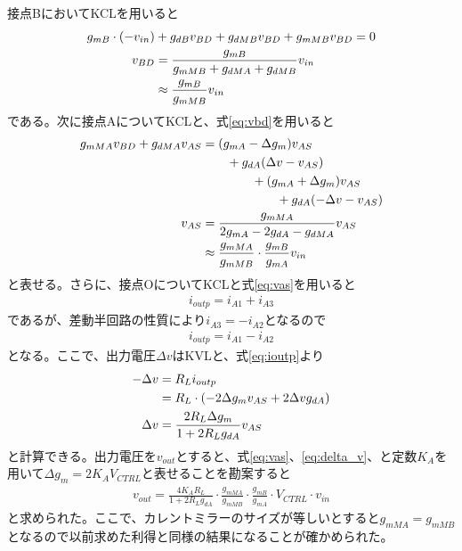 \documentclass[twocolumn]{jsarticle}
\begin{document}
    接点BにおいてKCLを用いると
    \begin{align}
        g_{mB}\cdot(-v_{in})&+g_{dB}v_{BD} +g_{dMB}v_{BD}+g_{mMB}v_{BD}=0       \notag\\
        v_{BD}&=\frac{g_{mB}}{g_{mMB}+g_{dMA}+g_{dMB}}v_{in}          \notag\\
        &\approx \frac{g_{mB}}{g_{mMB}}v_{in}    \label{eq:vbd}
    \end{align}
    である。次に接点AについてKCLと、式\eqref{eq:vbd}を用いると
    \begin{align}
        g_{mMA}v_{BD}+g_{dMA}v_{AS}&=(g_{mA}-\Delta g_{m})v_{AS} \notag\\ &\quad\quad +g_{dA}(\Delta v -v_{AS})       \notag\\
        & \quad\quad\quad\quad +(g_{mA}+\Delta g_{m})v_{AS} \notag\\& \quad\quad\quad\quad\quad\quad +g_{dA}(-\Delta v -v_{AS})       \notag\\
        v_{AS}&=\frac{g_{mMA}}{2g_{mA}-2g_{dA}-g_{dMA}}v_{AS}   \notag\\
        &\approx \frac{g_{mMA}}{g_{mMB}}\cdot\frac{g_{mB}}{g_{mA}}v_{in}    \label{eq:vas}
    \end{align}
    と表せる。さらに、接点OについてKCLと式\eqref{eq:vas}を用いると
    \begin{align}
        i_{outp} = i_{A1}+i_{A3}
    \end{align}
    であるが、差動半回路の性質により$i_{A3}=-i_{A2}$となるので
    \begin{align}
        i_{outp} = i_{A1}-i_{A2}    \label{eq:ioutp}
    \end{align}
    となる。ここで、出力電圧$\Delta v$はKVLと、式\eqref{eq:ioutp}より
    \begin{align}
        -\Delta v&=R_{L}i_{outp}    \notag\\
        &=R_{L}\cdot(-2\Delta g_{m}v_{AS}+2\Delta vg_{dA})      \notag\\
        \Delta v&=\frac{2R_{L}\Delta g_{m}}{1+2R_{L}g_{dA}}v_{AS}   \label{eq:delta_v}
    \end{align}
    と計算できる。出力電圧を$v_{out}$とすると、式\eqref{eq:vas}、\eqref{eq:delta_v}、と定数$K_{A}$を用いて$\Delta g_{m}=2K_{A}V_{CTRL}$と表せることを勘案すると
    \begin{align}
        v_{out}=\frac{4K_{A}R_{L}}{1+2R_{L}g_{dA}}\cdot\frac{g_{mMA}}{g_{mMB}}\cdot\frac{g_{mB}}{g_{mA}}\cdot V_{CTRL}\cdot v_{in}     \label{eq:vout}
    \end{align}
    と求められた。ここで、カレントミラーのサイズが等しいとすると$g_{mMA}=g_{mMB}$となるので以前求めた利得と同様の結果になることが確かめられた。
\end{document}
